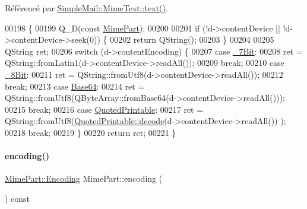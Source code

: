 Référencé par \hyperlink{class_simple_mail_1_1_mime_text_a0e08eb04baae349411b7b94e968147fb}{Simple\+Mail\+::\+Mime\+Text\+::text()}.


\begin{DoxyCode}
00198 \{
00199     Q\_D(\textcolor{keyword}{const} \hyperlink{class_simple_mail_1_1_mime_part}{MimePart});
00200 
00201     \textcolor{keywordflow}{if} (!d->contentDevice || !d->contentDevice->seek(0)) \{
00202         \textcolor{keywordflow}{return} QString();
00203     \}
00204 
00205     QString ret;
00206     \textcolor{keywordflow}{switch} (d->contentEncoding) \{
00207     \textcolor{keywordflow}{case} \hyperlink{class_simple_mail_1_1_mime_part_ae67a2f5406958b95b18bf31a7bbeb5c9a93d518d86036ce6f149ffa646b52235a}{\_7Bit}:
00208         ret = QString::fromLatin1(d->contentDevice->readAll());
00209         \textcolor{keywordflow}{break};
00210     \textcolor{keywordflow}{case} \hyperlink{class_simple_mail_1_1_mime_part_ae67a2f5406958b95b18bf31a7bbeb5c9a27c1574a6fe2fa936ae6cfe9654bb37f}{\_8Bit}:
00211         ret = QString::fromUtf8(d->contentDevice->readAll());
00212         \textcolor{keywordflow}{break};
00213     \textcolor{keywordflow}{case} \hyperlink{class_simple_mail_1_1_mime_part_ae67a2f5406958b95b18bf31a7bbeb5c9ae644dc14ba856889814d2da9c995b91a}{Base64}:
00214         ret = QString::fromUtf8(QByteArray::fromBase64(d->contentDevice->readAll()));
00215         \textcolor{keywordflow}{break};
00216     \textcolor{keywordflow}{case} \hyperlink{class_simple_mail_1_1_mime_part_ae67a2f5406958b95b18bf31a7bbeb5c9a29b5533d69a04cfef2c3ff6538c44db0}{QuotedPrintable}:
00217         ret = QString::fromUtf8(\hyperlink{class_simple_mail_1_1_quoted_printable_a0d2348902e414c30afbcd970e9270eea}{QuotedPrintable::decode}(d->contentDevice->readAll())
      );
00218         \textcolor{keywordflow}{break};
00219     \}
00220     \textcolor{keywordflow}{return} ret;
00221 \}
\end{DoxyCode}
\mbox{\label{class_simple_mail_1_1_mime_part_a7e7b2d8b6f32175fbc9d62e5b23ca720}} 
\paragraph{\texorpdfstring{encoding()}{encoding()}}
{\footnotesize\ttfamily \hyperlink{class_simple_mail_1_1_mime_part_ae67a2f5406958b95b18bf31a7bbeb5c9}{Mime\+Part\+::\+Encoding} Mime\+Part\+::encoding (\begin{DoxyParamCaption}{ }\end{DoxyParamCaption}) const}



